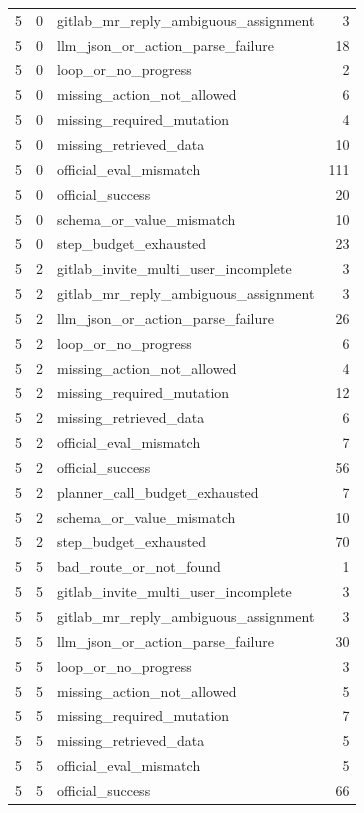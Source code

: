 \begin{tabular}{rrlr}
5 & 0 & gitlab_mr_reply_ambiguous_assignment & 3 \\
5 & 0 & llm_json_or_action_parse_failure & 18 \\
5 & 0 & loop_or_no_progress & 2 \\
5 & 0 & missing_action_not_allowed & 6 \\
5 & 0 & missing_required_mutation & 4 \\
5 & 0 & missing_retrieved_data & 10 \\
5 & 0 & official_eval_mismatch & 111 \\
5 & 0 & official_success & 20 \\
5 & 0 & schema_or_value_mismatch & 10 \\
5 & 0 & step_budget_exhausted & 23 \\
5 & 2 & gitlab_invite_multi_user_incomplete & 3 \\
5 & 2 & gitlab_mr_reply_ambiguous_assignment & 3 \\
5 & 2 & llm_json_or_action_parse_failure & 26 \\
5 & 2 & loop_or_no_progress & 6 \\
5 & 2 & missing_action_not_allowed & 4 \\
5 & 2 & missing_required_mutation & 12 \\
5 & 2 & missing_retrieved_data & 6 \\
5 & 2 & official_eval_mismatch & 7 \\
5 & 2 & official_success & 56 \\
5 & 2 & planner_call_budget_exhausted & 7 \\
5 & 2 & schema_or_value_mismatch & 10 \\
5 & 2 & step_budget_exhausted & 70 \\
5 & 5 & bad_route_or_not_found & 1 \\
5 & 5 & gitlab_invite_multi_user_incomplete & 3 \\
5 & 5 & gitlab_mr_reply_ambiguous_assignment & 3 \\
5 & 5 & llm_json_or_action_parse_failure & 30 \\
5 & 5 & loop_or_no_progress & 3 \\
5 & 5 & missing_action_not_allowed & 5 \\
5 & 5 & missing_required_mutation & 7 \\
5 & 5 & missing_retrieved_data & 5 \\
5 & 5 & official_eval_mismatch & 5 \\
5 & 5 & official_success & 66 \\

\end{tabular}
